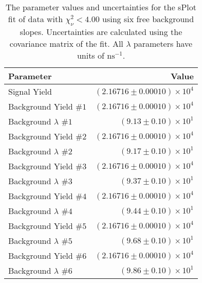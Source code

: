 
\begin{table}[ht]
    \begin{center}
        \begin{tabular}{lr}\toprule
            Parameter & Value \\\midrule
            Signal Yield & $(2.16716 \pm 0.00010) \times 10^{4}$ \\
            Background Yield $\#1$ & $(2.16716 \pm 0.00010) \times 10^{4}$ \\
            Background $\lambda$ $\#1$ & $(9.13 \pm 0.10) \times 10^{1}$ \\
            Background Yield $\#2$ & $(2.16716 \pm 0.00010) \times 10^{4}$ \\
            Background $\lambda$ $\#2$ & $(9.17 \pm 0.10) \times 10^{1}$ \\
            Background Yield $\#3$ & $(2.16716 \pm 0.00010) \times 10^{4}$ \\
            Background $\lambda$ $\#3$ & $(9.37 \pm 0.10) \times 10^{1}$ \\
            Background Yield $\#4$ & $(2.16716 \pm 0.00010) \times 10^{4}$ \\
            Background $\lambda$ $\#4$ & $(9.44 \pm 0.10) \times 10^{1}$ \\
            Background Yield $\#5$ & $(2.16716 \pm 0.00010) \times 10^{4}$ \\
            Background $\lambda$ $\#5$ & $(9.68 \pm 0.10) \times 10^{1}$ \\
            Background Yield $\#6$ & $(2.16716 \pm 0.00010) \times 10^{4}$ \\
            Background $\lambda$ $\#6$ & $(9.86 \pm 0.10) \times 10^{1}$ \\\bottomrule
        \end{tabular}
        \caption{The parameter values and uncertainties for the sPlot fit of data with $\chi^2_\nu < 4.00$ using six free background slopes. Uncertainties are calculated using the covariance matrix of the fit. All $\lambda$ parameters have units of $\si{\nano\second}^{-1}$.}\label{tab:splot-fit-results-chisqdof-4.00-free-6}
    \end{center}
\end{table}
